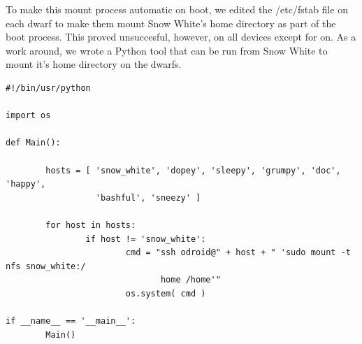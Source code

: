 To make this mount process automatic on boot, we edited the /etc/fstab file on each dwarf to make them mount Snow White's home directory as part of the boot process. This proved unsuccesful, however, on all devices except for on. As a work around, we wrote a Python tool that can be run from Snow White to mount it's home directory on the dwarfs.

\begin{lstlisting}
#!/bin/usr/python

import os

def Main():

        hosts = [ 'snow_white', 'dopey', 'sleepy', 'grumpy', 'doc', 'happy',
 				  'bashful', 'sneezy' ]

        for host in hosts:
                if host != 'snow_white':
                        cmd = "ssh odroid@" + host + " 'sudo mount -t nfs snow_white:/
							   home /home'"
                        os.system( cmd )

if __name__ == '__main__':
        Main()
\end{lstlisting}

